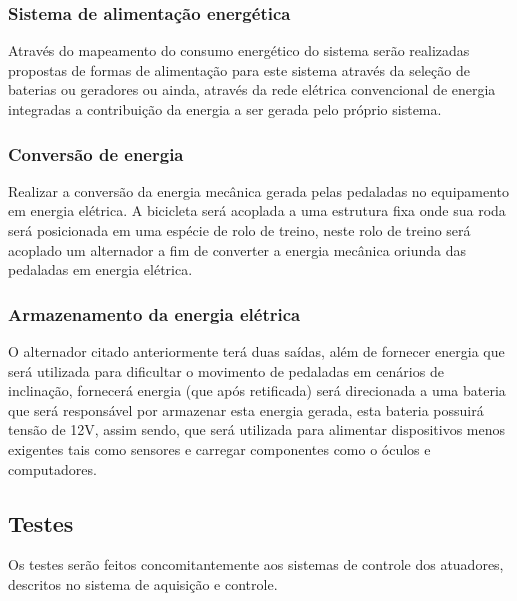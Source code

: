 \subsubsection{Sistema de alimentação energética} Através do mapeamento do consumo energético do sistema serão realizadas propostas de formas de alimentação para este sistema através da seleção de baterias ou geradores ou ainda, através da rede elétrica convencional de energia integradas a contribuição da energia a ser gerada pelo próprio sistema. 
 
\subsubsection{Conversão de energia}Realizar a conversão da energia mecânica gerada pelas pedaladas no equipamento em energia elétrica. A bicicleta será acoplada a uma estrutura fixa onde sua roda será posicionada em uma espécie de rolo de treino, neste rolo de treino será acoplado um alternador a fim de converter a energia mecânica oriunda das pedaladas em energia elétrica.

\subsubsection{Armazenamento da energia elétrica} O alternador citado anteriormente terá duas saídas, além de fornecer energia que será utilizada para dificultar o movimento de pedaladas em cenários de inclinação, fornecerá energia (que após retificada) será direcionada a uma bateria que será responsável por armazenar esta energia gerada, esta bateria possuirá tensão de 12V, assim sendo, que será utilizada para alimentar dispositivos menos exigentes tais como sensores e carregar componentes como o óculos e computadores. 

\subsection{Testes}
Os testes serão feitos concomitantemente aos sistemas de controle dos atuadores, descritos no sistema de aquisição e controle.